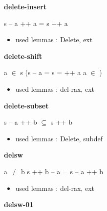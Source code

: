 \documentclass[a4paper]{article}
\begin{document}
\bigskip

{\large\bf delete-insert}

\medskip

 \Fol s -- a ++ a = s ++ a

\begin{itemize}


\item       used lemmas  : Delete, ext

\end{itemize}

\medskip

\bigskip

{\large\bf delete-shift}

\medskip

 \Fol a $\in$ s \Imp (s -- a =  \Equiv s =  ++ a \And \Not a $\in$ )

\begin{itemize}


\item       used lemmas  : del-rax, ext

\end{itemize}

\medskip

\bigskip

{\large\bf delete-subset}

\medskip

 \Fol s -- a ++ b $\subseteq$ s ++ b

\begin{itemize}


\item       used lemmas  : Delete, subdef

\end{itemize}

\medskip

\bigskip

{\large\bf delsw}

\medskip

 \Fol a $\neq$ b \Imp s ++ b -- a = s -- a ++ b

\begin{itemize}


\item       used lemmas  : del-rax, ext

\end{itemize}

\medskip

\bigskip

{\large\bf delsw-01}
\end{document}

